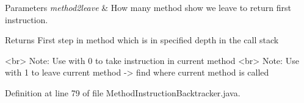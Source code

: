\begin{DoxyParams}{Parameters}
{\em method2leave} & How many method show we leave to return first instruction. \\
\hline
\end{DoxyParams}
\begin{DoxyReturn}{Returns}
First step in method which is in specified depth in the call stack \begin{DoxyVerb}    <br> Note: Use with 0 to take instruction in current method
    <br> Note: Use with 1 to leave current method -> find where current method is called\end{DoxyVerb}
 
\end{DoxyReturn}


Definition at line 79 of file Method\+Instruction\+Backtracker.\+java.


